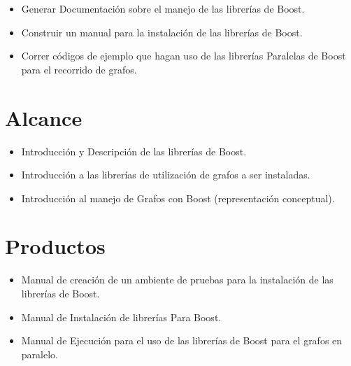 	\begin{itemize}
		\item Generar Documentación sobre el manejo de las librerías de Boost.
		\item Construir un manual para la instalación de las librerías de Boost.
		\item Correr códigos de ejemplo que hagan uso de las librerías Paralelas de Boost para el recorrido de grafos.	
	\end{itemize}

\section{Alcance}
	\begin{itemize}
		\item Introducción y Descripción de las librerías de Boost.
		\item Introducción a las librerías de utilización de grafos a ser instaladas.
		\item Introducción al manejo de Grafos con Boost (representación conceptual).
	\end{itemize}

\section{Productos}
	\begin{itemize}
		\item Manual de creación de un ambiente de pruebas para la instalación de las librerías de Boost.
		\item Manual de Instalación de librerías Para Boost.
		\item Manual de Ejecución para el uso de las librerías de Boost para el grafos en paralelo.	
	\end{itemize}

